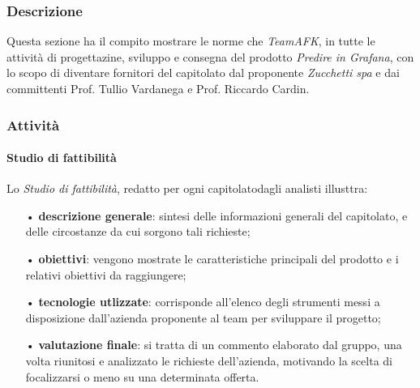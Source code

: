 		\subsubsection{Descrizione}
		Questa sezione ha il compito mostrare le norme che \textit{TeamAFK}, in tutte le attività di progettazine, sviluppo e consegna del prodotto \textit{Predire in Grafana}, con lo scopo di diventare fornitori del capitolato  dal proponente \textit{Zucchetti spa} e dai committenti Prof. Tullio Vardanega e Prof. Riccardo Cardin.
		\subsubsection{Attività}
			\paragraph{Studio di fattibilità}
			Lo \textit{Studio di fattibilità}, redatto per ogni capitolato\glo dagli analisti illusttra:
			\begin{itemize}
				\item[•] \textbf{descrizione generale}: sintesi delle informazioni generali del capitolato, e delle circostanze da cui sorgono tali richieste;
				\item[•] \textbf{obiettivi}: vengono mostrate le caratteristiche principali del prodotto e i relativi obiettivi da raggiungere;
				\item[•] \textbf{tecnologie utlizzate}: corrisponde all'elenco degli strumenti messi a disposizione dall'azienda proponente al team per sviluppare il progetto;
				\item[•] \textbf{valutazione finale}: si tratta di un commento elaborato dal gruppo, una volta riunitosi e analizzato le  richieste dell'azienda, motivando la scelta di focalizzarsi o meno su una determinata offerta.
			\end{itemize}


